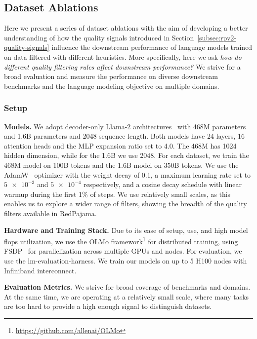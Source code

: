 \documentclass{article}
\begin{document}
\subsection{Dataset Ablations}
\label{sec:ablations}
Here we present a series of dataset ablations with the aim of developing a better understanding of how the quality signals introduced in Section~\ref{subsec:rpv2-quality-signals} influence the downstream performance of language models trained on data filtered with different heuristics. More specifically, here we ask \emph{how do different quality filtering rules affect downstream performance?}
We strive for a broad evaluation and measure the performance on diverse downstream benchmarks and the language modeling objective on multiple domains.


\subsubsection{Setup} 
{\bf Models.} We adopt decoder-only Llama-2 architectures~\cite{touvron2023bllama} with 468M parameters and 1.6B parameters and 2048 sequence length. Both models have 24 layers, 16 attention heads and the MLP expansion ratio set to 4.0. The 468M has 1024 hidden dimension, while for the 1.6B we use 2048. For each dataset, we train the 468M model on 100B tokens and the 1.6B model on 350B tokens. We use the AdamW~\cite{diederik2014adam} optimizer with the weight decay of 0.1, a maximum learning rate set to $\num{5e-3}$ and $\num{5e-4}$ respectively, and a cosine decay schedule with linear warmup during the first 1\% of steps.
We use relatively small scales, as this enables us to explore a wider range of filters, showing the breadth of the quality filters available in RedPajama.


{\bf Hardware and Training Stack.} Due to its ease of setup, use, and high model flops utilization, we use the OLMo framework\footnote{\url{https://github.com/allenai/OLMo}} for distributed training, using FSDP~\cite{zhao2023pytorch} for parallelization across multiple GPUs and nodes. For evaluation, we use the lm-evaluation-harness. We train our models on up to 5 H100 nodes with Infiniband interconnect.


{\bf Evaluation Metrics.}
We strive for broad coverage of benchmarks and domains. At the same time, we are operating at a relatively small scale, where many tasks are too hard to provide a high enough signal to distinguish datasets. 
\end{document}
